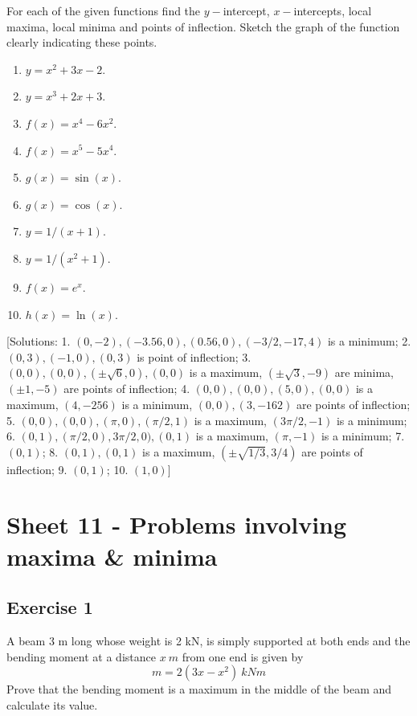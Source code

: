 \documentclass[
  english,
  11pt,
  oneside]{book}
\providecommand{\tightlist}{%
  \setlength{\itemsep}{0pt}\setlength{\parskip}{0pt}}
\newcommand{\slide}{}
\theoremstyle{definition}
\theoremstyle{definition}
\theoremstyle{definition}
\theoremstyle{definition}
\theoremstyle{remark}
\begin{document}
For each of the given functions find the \(y-\)intercept, \(x-\)intercepts, local maxima, local minima
and points of inflection. Sketch the graph of the function clearly indicating these points.

\begin{enumerate}
\def\labelenumi{\arabic{enumi}.}
\tightlist
\item
  \(y=x^2+3x-2\).
\item
  \(y=x^3+2x+3\).
\item
  \(f(x)=x^4-6x^2\).
\item
  \(f(x)=x^5-5x^4\).
\item
  \(g(x)=\sin(x)\).
\item
  \(g(x)=\cos(x)\).
\item
  \(y=1/(x+1)\).
\item
  \(y=1/(x^2+1)\).
\item
  \(f(x)=e^x\).
\item
  \(h(x)=\ln(x)\).
\end{enumerate}

{[}Solutions: 1. \((0,-2), (-3.56,0), (0.56,0), (-3/2,-17,4)\) is a minimum; 2. \((0,3), (-1,0), (0,3)\) is point of inflection; 3. \((0,0), (0,0), (\pm\sqrt{6},0), (0,0)\) is a maximum, \((\pm\sqrt{3},-9)\) are minima, \((\pm 1,-5)\) are points of inflection; 4. \((0,0), (0,0), (5,0), (0,0)\) is a maximum, \((4,-256)\) is a minimum, \((0,0), (3,-162)\) are points of inflection; 5. \((0,0), (0,0), (\pi,0), (\pi/2,1)\) is a maximum, \((3\pi/2,-1)\) is a minimum; 6. \((0,1), (\pi/2,0), 3\pi/2,0), (0,1)\) is a maximum, \((\pi,-1)\) is a minimum; 7. \((0,1)\); 8. \((0,1), (0,1)\) is a maximum, \((\pm\sqrt{1/3},3/4)\) are points of inflection; 9. \((0,1)\); 10. \((1,0)\){]}
\slide

\section{Sheet 11 - Problems involving maxima \& minima}\label{sheet-11---problems-involving-maxima-minima}

\subsection*{Exercise 1}\label{exercise-1-4}

A beam 3 m long whose weight is 2 kN, is simply supported at both ends and the bending moment at a distance \(x\ m\) from one end is given by
\[m = 2(3x - x^2)\ kNm\]
Prove that the bending moment is a maximum in the middle of the beam and calculate its value.
\end{document}
